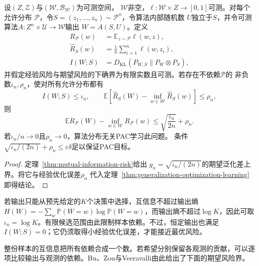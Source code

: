 \begin{theorem}[互信息稳定性与可学习性]
\label{thm:mutual-information-learning}
设$(Z,\mathcal Z)$与$(\mathcal W,\mathcal B_{\mathcal W})$为可测空间，
$\mathcal W$非空，$\ell:\mathcal W\times Z\to[0,1]$可测。对每个允许分布
$\mathcal P$，令$S=(z_1,\ldots,z_n)\sim\mathcal P^n$，令算法内部随机数
$U$独立于$S$，并令可测算法$A:Z^n\times\mathcal U\to\mathcal W$输出
$W=A(S,U)$。定义
\[
\begin{aligned}
 R_{\mathcal P}(w)
 &=\mathbb E_{z\sim\mathcal P}\ell(w,z),\\
 \hat R_S(w)
 &=\frac1n\sum_{i=1}^n\ell(w,z_i),\\
 I(W;S)
 &=D_{\mathrm{KL}}(P_{W,S}\|P_W\otimes P_S),
\end{aligned}
\]
并假定经验风险与期望风险的下确界为有限实数且可测。若存在不依赖$\mathcal P$的
非负数$\iota_n,\rho_n$，使对所有允许分布都有
\[
 I(W;S)\leq\iota_n,\qquad
 \mathbb E[\hat R_S(W)-\inf_{w\in\mathcal W}\hat R_S(w)]\leq\rho_n,
\]
则
\[
 \mathbb E R_{\mathcal P}(W)-\inf_{w\in\mathcal W}R_{\mathcal P}(w)
 \leq\sqrt{\frac{\iota_n}{2n}}+\rho_n.
\]
若$\iota_n/n\to0$且$\rho_n\to0$，算法分布无关PAC学习此问题。
条件$\sqrt{\iota_n/(2n)}+\rho_n\leq\varepsilon\delta$足以保证PAC目标。
\end{theorem}
\begin{proof}
定理~\ref{thm:mutual-information-risk}给出
$g_n=\sqrt{\iota_n/(2n)}$的期望泛化差上界。将它与经验优化误差$\rho_n$
代入定理~\ref{thm:generalization-optimization-learning}即得结论。
\end{proof}

若输出只能从预先给定的$K$个决策中选择，互信息不超过输出熵$H(W)=-\sum_w\mathbb P(W=w)\log\mathbb P(W=w)$，而输出熵不超过$\log K$，因此可取$\iota_n=\log K$。有限候选范围由此限制样本依赖。不过，恒定输出也满足$I(W;S)=0$；它仍须取得小经验优化误差，才能接近最优风险。

整份样本的互信息把所有依赖合成一个数。若希望分别保留各观测的贡献，可以逐项比较输出与观测的依赖。Bu、Zou与Veeravalli由此给出了下面的期望风险界。


